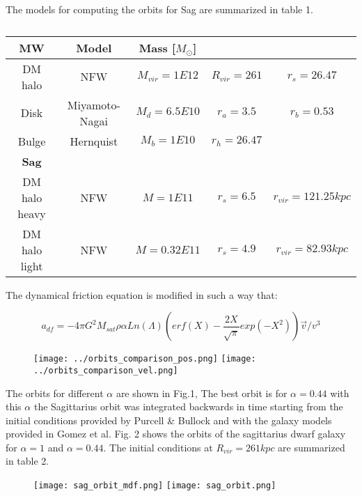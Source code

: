 \label{sec:intro}

The models for computing the orbits for Sag are summarized in table 1.

\begin{table}[H]
\begin{center}
\begin{tabular}{c c c c c}
\hline
\textbf{MW} & Model & Mass [$M_{\odot}$] &  & \\
\hline
DM halo & NFW & $M_{vir} = 1E12$ &$R_{vir} = 261$ &  $r_s = 26.47$ \\
Disk & Miyamoto-Nagai &  $M_d = 6.5E10$ & $r_a = 3.5$ &  $r_b=0.53$  \\
Bulge & Hernquist &  $M_b = 1E10$  & $r_{h} = 26.47 $ &   \\
\hline
\textbf{Sag} & & & &  \\
\hline
DM halo heavy& NFW & $M = 1E11 $ & $r_s=6.5$ & $r_{vir} = 121.25 kpc$ \\
DM halo light & NFW & $M=0.32E11 $ & $r_s = 4.9$ & $r_{vir} = 82.93 kpc$ \\
\hline
\end{tabular}
\end{center}
\caption{}
\end{table}

The dynamical friction equation is modified in such a way that:

\begin{equation}
a_{df} = -4\pi G^2 M_{sat} \rho \alpha Ln(\Lambda)  \left( erf(X) - \dfrac{2X}{\sqrt{\pi}}exp(-X^2)   \right) \vec{v}/v^3
\end{equation}

\begin{figure}
\centering
\texttt{[image: ../orbits\_comparison\_pos.png]}
\texttt{[image: ../orbits\_comparison\_vel.png]}
\caption{}
\end{figure}

The orbits for different $\alpha$ are shown in Fig.1, The best orbit is for $\alpha=0.44$
with this $\alpha$
the Sagittarius orbit was integrated backwards in time starting
from the initial conditions provided by Purcell \& Bullock and 
with the galaxy models provided in Gomez et al. Fig. 2 shows
the orbits of the sagittarius dwarf galaxy for $\alpha=1$
and $\alpha=0.44$. The initial conditions at $R_{vir}=261 kpc$
are summarized in table 2.

\begin{figure}
\centering
\texttt{[image: sag\_orbit\_mdf.png]}
\texttt{[image: sag\_orbit.png]}
\caption{}
\end{figure}

